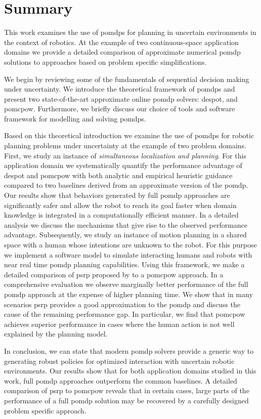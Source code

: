 \chapter{Summary}\label{chap:summary}

This work examines the use of \acfp{pomdp} for planning in uncertain
environments in the context of robotics. At the example of two continuous-space
application domains we provide a detailed comparison of approximate numerical
\ac{pomdp} solutions to approaches based on problem specific simplifications.

We begin by reviewing some of the fundamentals of sequential decision making
under uncertainty. We introduce the theoretical framework of \acp{pomdp} and
present two state-of-the-art approximate online \ac{pomdp} solvers:
\acf{despot}, and \acf{pomcpow}. Furthermore, we briefly discuss our choice of
tools and software framework for modelling and solving
\acp{pomdp}.

Based on this theoretical introduction we examine the use of \acp{pomdp} for
robotic planning problems under uncertainty at the example of two problem
domains. First, we study an instance of \emph{simultaneous localization and
planning}. For this application domain we systematically quantify the
performance advantage of \ac{despot} and \ac{pomcpow} with both analytic and
empirical heuristic guidance compared to two baselines derived from an
approximate version of the \ac{pomdp}. Our results show that behaviors
generated by full \ac{pomdp} approaches are significantly safer and allow the
robot to reach its goal faster when domain knowledge is integrated in
a computationally efficient manner. In a detailed analysis we discuss the
mechanisms that give rise to the observed performance advantage.
Subsequently, we study an instance of motion planning in a shared space with
a human whose intentions are unknown to the robot. For this purpose we
implement a software model to simulate interacting humans and robots with near
real time \ac{pomdp} planning capabilities. Using this framework, we make
a detailed comparison of \acf{psrp} proposed by
\cite{fisac2018probabilistically} to a \ac{pomcpow} approach. In
a comprehensive evaluation we observe marginally better performance of the full
\ac{pomdp} approach at the expense of higher planning time. We show that in
many scenarios \ac{psrp} provides a good approximation to the \ac{pomdp} and
discuss the cause of the remaining performance gap. In particular, we find that
\ac{pomcpow} achieves superior performance in cases where the human action is
not well explained by the planning model.

In conclusion, we can state that modern \ac{pomdp} solvers provide a generic
way to generating robust policies for optimized interaction with uncertain
robotic environments. Our results show that for both application domains
studied in this work, full \ac{pomdp} approaches outperform the common
baselines. A detailed comparison of \ac{psrp} to \ac{pomcpow} reveals that in
certain cases, large parts of the performance of a full \ac{pomdp} solution may
be recovered by a carefully designed problem specific approach.
